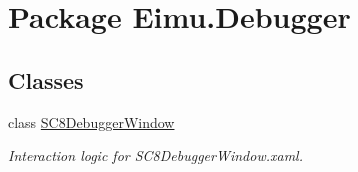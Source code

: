 \hypertarget{namespace_eimu_1_1_debugger}{
\section{Package Eimu.Debugger}
\label{namespace_eimu_1_1_debugger}
}
\subsection*{Classes}
\begin{DoxyCompactItemize}
\item 
class \hyperlink{class_eimu_1_1_debugger_1_1_s_c8_debugger_window}{SC8DebuggerWindow}
\begin{DoxyCompactList}\small\item\em Interaction logic for SC8DebuggerWindow.xaml. \item\end{DoxyCompactList}\end{DoxyCompactItemize}
